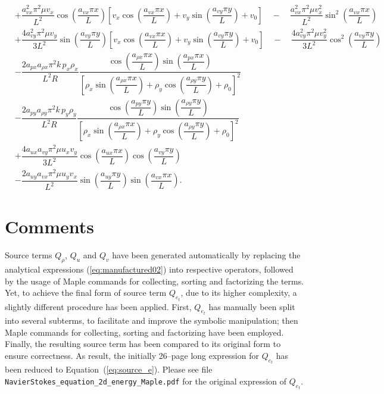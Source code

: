 \documentclass[10pt]{article}
\begin{document}
\begin{landscape}
\begin{equation*}
\begin{split}
& + \dfrac{a_{vx}^2\pi ^2\mu v_x}{L^2} \cos\left(\dfrac{a_{vx} \pi x}{L}\right)\left[v_x \cos\left(\dfrac{a_{vx} \pi x}{L}\right) + v_y \sin\left(\dfrac{a_{vy} \pi y}{L}\right) + v_0\right]\quad - \quad\dfrac{a_{vx}^2\pi ^2\mu v_x^2}{L^2} \sin^2\left(\dfrac{a_{vx} \pi x}{L}\right)\\
& + \dfrac{4 a_{vy}^2\pi ^2\mu v_y}{3L^2} \sin\left(\dfrac{a_{vy} \pi y}{L}\right)\left[v_x \cos\left(\dfrac{a_{vx} \pi x}{L}\right) + v_y \sin\left(\dfrac{a_{vy} \pi y}{L}\right) + v_0\right]\quad - \quad\dfrac{4a_{vy}^2\pi ^2\mu v_y^2}{3L^2} \cos^2\left(\dfrac{a_{vy} \pi y}{L}\right)\\
& - \dfrac{2a_{px}a_{\rho x} \pi ^2k\,p_x\rho_x}{L^2R}\dfrac{ \cos\left(\dfrac{a_{\rho x} \pi x}{L}\right) \sin\left(\dfrac{a_{px} \pi x}{L}\right)}{\left[\rho_x \sin\left(\dfrac{a_{\rho x} \pi x}{L}\right) + \rho_y \cos\left(\dfrac{a_{\rho y} \pi y}{L}\right) + \rho_0\right]^2}\\
& - \dfrac{2a_{py}a_{\rho y}\pi ^2k\,p_y\rho_y}{L^2R}\dfrac{ \cos\left(\dfrac{a_{py} \pi y}{L}\right) \sin\left(\dfrac{a_{\rho y} \pi y}{L}\right)}{\left[\rho_x \sin\left(\dfrac{a_{\rho x} \pi x}{L}\right) + \rho_y \cos\left(\dfrac{a_{\rho y} \pi y}{L}\right) + \rho_0\right]^2}\\
& + \dfrac{4a_{ux}a_{vy}\pi ^2\mu u_x v_y}{3L^2} \cos\left(\dfrac{a_{ux} \pi x}{L}\right) \cos\left(\dfrac{a_{vy} \pi y}{L}\right)\\
& - \dfrac{2a_{uy}a_{vx}\pi ^2\mu u_y v_x}{L^2} \sin\left(\dfrac{a_{uy} \pi y}{L}\right) \sin\left(\dfrac{a_{vx} \pi x}{L}\right).
\end{split}
\end{equation*}




\section{Comments}


Source terms $Q_{\rho}$, $Q_u$ and $Q_v$ have been generated automatically by replacing the analytical expressions (\ref{eq:manufactured02}) into  respective operators, followed by the usage of Maple commands for collecting, sorting and factorizing the terms. Yet,  to achieve the final form of source term $Q_{e_t}$, due to its higher complexity, a slightly different procedure has been applied.  First, $Q_{e_t}$ has manually been split into several subterms, to facilitate and improve the symbolic manipulation; then Maple commands for collecting, sorting and factorizing have been employed. Finally, the resulting source term has been compared to its original form to ensure correctness. As  result, the initially 26--page long expression for $Q_{e_t}$ has been  reduced to Equation~(\ref{eq:source_e}). Please see file {\tt NavierStokes\_equation\_2d\_energy\_Maple.pdf} for the original expression of $Q_{e_t}$.


\end{landscape}
\end{document}
